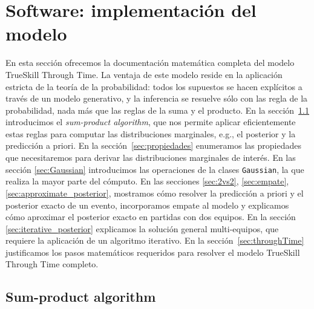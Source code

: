 \documentclass[a4paper,11pt]{book}
\theoremstyle{definition}
\begin{document}
\section{Software: implementación del modelo}


En esta sección ofrecemos la documentación matemática completa del modelo TrueSkill Through Time.
%
La ventaja de este modelo reside en la aplicación estricta de la teoría de la probabilidad: todos los supuestos se hacen explícitos a través de un modelo generativo, y la inferencia se resuelve sólo con las regla de la probabilidad, nada más que las reglas de la suma y el producto.
%
En la sección~\ref{sec:sumProductAlgorithm} introducimos el \emph{sum-product algorithm}, que nos permite aplicar eficientemente estas reglas para computar las distribuciones marginales, e.g., el posterior y la predicción a priori.
%
En la sección~\ref{sec:propiedades} enumeramos las propiedades que necesitaremos para derivar las distribuciones marginales de interés.
%
En las sección \ref{sec:Gaussian} introducimos las operaciones de la clases \texttt{Gaussian}, la que realiza la mayor parte del cómputo.
%
En las secciones \ref{sec:2vs2}, \ref{sec:empate}, \ref{sec:approximate_posterior}, mostramos cómo resolver la predicción a priori y el posterior exacto de un evento, incorporamos empate al modelo y explicamos cómo aproximar el posterior exacto en partidas con dos equipos.
%
En la sección \ref{sec:iterative_posterior} explicamos la solución general multi-equipos, que requiere la aplicación de un algoritmo iterativo.
%
En la sección~\ref{sec:throughTime} justificamos los pasos matemáticos requeridos para resolver el modelo TrueSkill Through Time completo.


\subsection{Sum-product algorithm} \label{sec:sumProductAlgorithm}
\end{document}
